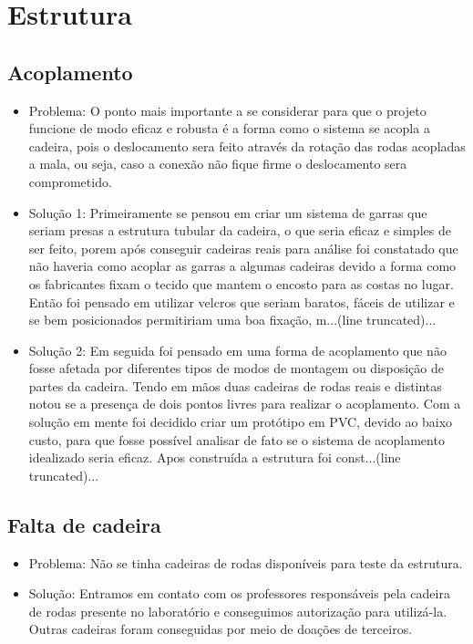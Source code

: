 \section{Estrutura}

\subsection{Acoplamento}
 \begin{itemize}
  \item Problema: O ponto mais importante a se considerar para que o projeto funcione de modo eficaz e robusta é a forma como o sistema se acopla a cadeira, pois o deslocamento sera feito através da rotação das rodas acopladas a mala, ou seja, caso  a conexão não fique firme o deslocamento sera comprometido.
  \item Solução 1: Primeiramente se pensou em criar um sistema de garras que seriam presas a estrutura tubular da cadeira, o que seria eficaz e simples de ser feito, porem após conseguir cadeiras reais para análise foi constatado que não haveria como acoplar as garras a algumas cadeiras devido a forma como os fabricantes fixam o tecido que mantem o encosto para as costas no lugar. Então foi pensado em utilizar velcros que seriam baratos, fáceis de utilizar e se bem posicionados permitiriam uma boa fixação, m...(line truncated)...
  \item Solução 2: Em seguida foi pensado em uma forma de acoplamento que não fosse afetada por diferentes tipos de modos de montagem ou disposição de partes da cadeira. Tendo em mãos duas cadeiras de rodas reais e distintas notou se a presença de dois pontos livres para realizar o acoplamento. Com a solução em mente foi decidido criar um protótipo em PVC, devido ao baixo custo, para que fosse possível analisar de fato se o sistema de acoplamento idealizado seria eficaz. Apos construída a estrutura foi const...(line truncated)...

 \end{itemize}

\subsection{Falta de cadeira}
 \begin{itemize}
  \item Problema: Não se tinha cadeiras de rodas disponíveis para teste da estrutura.
  \item Solução: Entramos em contato com os professores responsáveis pela cadeira de rodas presente no laboratório e conseguimos autorização para utilizá-la. Outras cadeiras foram conseguidas por meio de doações de terceiros.

 \end{itemize}
